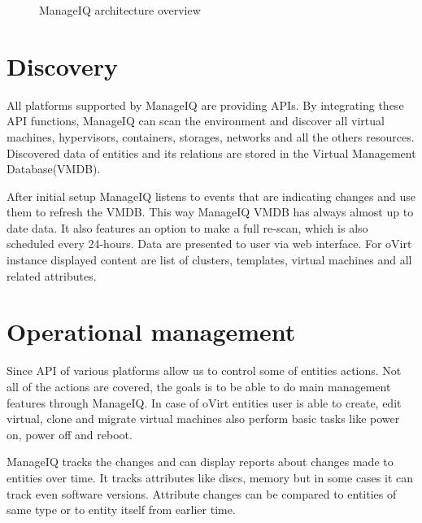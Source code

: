 \begin{figure}[h]
\caption{ManageIQ architecture overview \cite{manageIQimg}}
\label{miq_architecture}
\end{figure}

\section{Discovery}
All platforms supported by ManageIQ are providing APIs. By integrating these API functions, ManageIQ can scan the environment and discover all virtual machines, hypervisors, containers, storages, networks and all the others resources. Discovered data of entities and its relations are stored in the Virtual Management Database(VMDB). 

After initial setup ManageIQ listens to events that are indicating changes and use them to refresh the VMDB. This way ManageIQ VMDB has always almost up to date data. It also features an option to make a full re-scan, which is also scheduled every 24-hours.
Data are presented to user via web interface. For oVirt instance displayed content are list of clusters, templates, virtual machines and all related attributes.

\section{Operational management}
Since API of various platforms allow us to control some of entities actions. Not all of the actions are covered, the goals is to be able to do main management features through ManageIQ. 
In case of oVirt entities user is able to create, edit virtual, clone and migrate virtual machines also perform basic tasks like power on, power off and reboot.

ManageIQ tracks the changes and can display reports about changes made to entities over time. It tracks attributes like discs, memory but in some cases it can track even software versions. Attribute changes can be compared to entities of same type or to entity itself from earlier time.

